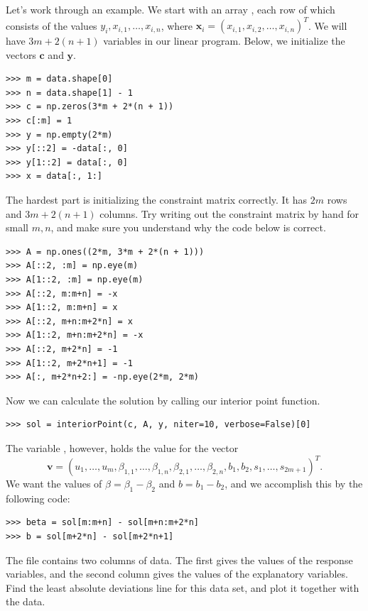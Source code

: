 Let's work through an example. We start with an array , each row of which consists of the values $y_i, x_{i,1},\ldots,x_{i,n}$,
where $\mathbf{x}_i = (x_{i,1}, x_{i,2}, \ldots, x_{i,n})^T$. We will have $3m + 2(n+1)$ variables in our linear program. Below, we initialize
the vectors $\mathbf{c}$ and $\mathbf{y}$.
\begin{lstlisting}
>>> m = data.shape[0]
>>> n = data.shape[1] - 1
>>> c = np.zeros(3*m + 2*(n + 1))
>>> c[:m] = 1
>>> y = np.empty(2*m)
>>> y[::2] = -data[:, 0]
>>> y[1::2] = data[:, 0]
>>> x = data[:, 1:]
\end{lstlisting}

The hardest part is initializing the constraint matrix correctly. It has $2m$ rows and $3m + 2(n+1)$ columns. Try writing out the
constraint matrix by hand for small $m, n$, and make sure you understand why the code below is correct.
\begin{lstlisting}
>>> A = np.ones((2*m, 3*m + 2*(n + 1)))
>>> A[::2, :m] = np.eye(m)
>>> A[1::2, :m] = np.eye(m)
>>> A[::2, m:m+n] = -x
>>> A[1::2, m:m+n] = x
>>> A[::2, m+n:m+2*n] = x
>>> A[1::2, m+n:m+2*n] = -x
>>> A[::2, m+2*n] = -1
>>> A[1::2, m+2*n+1] = -1
>>> A[:, m+2*n+2:] = -np.eye(2*m, 2*m)
\end{lstlisting}

Now we can calculate the solution by calling our interior point function.
\begin{lstlisting}
>>> sol = interiorPoint(c, A, y, niter=10, verbose=False)[0]
\end{lstlisting}

The variable , however, holds the value for the vector
\[
\mathbf{v} = (u_1,\ldots, u_m, \beta_{1,1},\ldots, \beta_{1,n}, \beta_{2,1},\ldots, \beta_{2,n}, b_1, b_2, s_1,\ldots,s_{2m+1})^T.
\]
We want the values of $\beta = \beta_1-\beta_2$ and $b = b_1 - b_2$, and we accomplish this by the
following code:
\begin{lstlisting}
>>> beta = sol[m:m+n] - sol[m+n:m+2*n]
>>> b = sol[m+2*n] - sol[m+2*n+1]
\end{lstlisting}

\begin{problem}
The file  contains two columns of data. The first gives the values of the response
variables, and the second column gives the values of the explanatory variables. Find the least absolute
deviations line for this data set, and plot it together with the data.
\end{problem} 